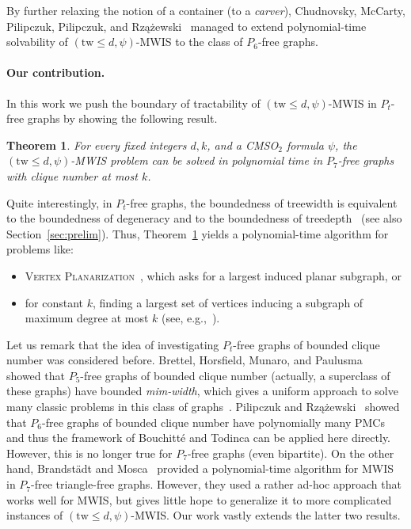 \documentclass[11pt,a4paper]{article}
\newtheorem{theorem}{Theorem}[section]
\theoremstyle{definition}
\newcommand{\CMSO}{\textsf{CMSO}$_2$\xspace}
\begin{document}
By further relaxing the notion of a container (to a \emph{carver}), Chudnovsky, McCarty, Pilipczuk, Pilipczuk, and Rzążewski~\cite{DBLP:conf/soda/ChudnovskyMPPR24} managed to extend polynomial-time solvability of $(\mathrm{tw} \leq d,\psi)$-MWIS to the class of $P_6$-free graphs.

\paragraph{Our contribution.}
In this work we push the boundary of tractability of $(\mathrm{tw} \leq d,\psi)$-MWIS in $P_t$-free graphs by showing the following result.

\begin{theorem}\label{thm:mainalgo}
    For every fixed integers $d,k$, and a \CMSO formula $\psi$,
    the $(\mathrm{tw} \leq d, \psi)$-MWIS problem can be solved in polynomial time
    in $P_7$-free graphs with clique number at most $k$.
\end{theorem}

Quite interestingly, in $P_t$-free graphs, the boundedness of treewidth is equivalent to the boundedness of degeneracy and to the boundedness of treedepth~\cite{DBLP:journals/jctb/BonamyBPRTW22} (see also Section~\ref{sec:prelim}).
Thus, Theorem~\ref{thm:mainalgo} yields a polynomial-time algorithm for problems like:
\begin{itemize}
\item \textsc{Vertex Planarization}~\cite{DBLP:conf/soda/JansenLS14,DBLP:journals/dam/Pilipczuk17}, which asks for a largest induced planar subgraph, or
\item for constant $k$, finding a largest set of vertices inducing a subgraph of maximum degree at most $k$ (see, e.g.,~\cite{zbMATH05818768}).
\end{itemize}

Let us remark that the idea of investigating $P_t$-free graphs of bounded clique number was considered before. 
Brettel, Horsfield, Munaro, and Paulusma~\cite{DBLP:journals/ipl/BrettellHMP22} showed that $P_5$-free graphs of bounded clique number (actually, a superclass of these graphs) have bounded \emph{mim-width}, which gives a uniform approach to solve many classic problems in this class of graphs~\cite{DBLP:conf/soda/BergougnouxDJ23}.
Pilipczuk and Rzążewski~\cite{pilipczuk2023polynomial} showed that $P_6$-free graphs of bounded clique number have polynomially many PMCs and thus the framework of Bouchitt\'e and Todinca can be applied here directly.
However, this is no longer true for $P_7$-free graphs (even bipartite).
On the other hand, Brandst\"adt and Mosca~\cite{DBLP:journals/dam/BrandstadtM18} provided a polynomial-time algorithm for MWIS in $P_7$-free triangle-free graphs. However, they used a rather ad-hoc approach that works well for MWIS, but gives little hope to generalize it to more complicated instances of $(\mathrm{tw} \leq d, \psi)$-MWIS.
Our work vastly extends the latter two results.
\end{document}
